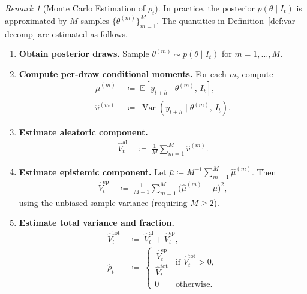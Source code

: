 \documentclass[12pt,openany]{book}
\newcommand{\calI}{\mathcal{I}}
\newcommand{\E}{\mathbb{E}}
\numberwithin{equation}{chapter}
\theoremstyle{plain}
\theoremstyle{definition}
\theoremstyle{remark}
\newtheorem{remark}[theorem]{Remark}
\numberwithin{equation}{chapter}
\theoremstyle{plain}
\DeclareMathOperator{\Var}{Var}
\def\calI{I}%
\begin{document}
\begin{remark}[Monte Carlo Estimation of $\rho_t$]
\label{rem:mc-estimate}
In practice, the posterior $p(\theta \mid \calI_t)$ is approximated
by $M$ samples $\{\theta^{(m)}\}_{m=1}^{M}$.  The quantities
in Definition~\ref{def:var-decomp} are estimated as follows.
\begin{enumerate}
  \item \textbf{Obtain posterior draws.}
        Sample $\theta^{(m)} \sim p(\theta \mid \calI_t)$ for
        $m = 1, \ldots, M$.

  \item \textbf{Compute per-draw conditional moments.}
        For each $m$, compute
        \begin{align}
          \hat\mu^{(m)}
          &\;\coloneqq\;
          \E\!\left[y_{t+h} \mid \theta^{(m)},\, \calI_t\right],
          \label{eq:mu-hat-m}\\
          \hat v^{(m)}
          &\;\coloneqq\;
          \Var\!\left(y_{t+h} \mid \theta^{(m)},\, \calI_t\right).
          \label{eq:v-hat-m}
        \end{align}

  \item \textbf{Estimate aleatoric component.}
        \begin{align}
          \hat V^{\mathrm{al}}_t
          &\;\coloneqq\;
          \frac{1}{M} \sum_{m=1}^{M} \hat v^{(m)}.
          \label{eq:Val-mc}
        \end{align}

  \item \textbf{Estimate epistemic component.}
        Let $\bar\mu \coloneqq M^{-1}\sum_{m=1}^M \hat\mu^{(m)}$.
        Then
        \begin{align}
          \hat V^{\mathrm{ep}}_t
          &\;\coloneqq\;
          \frac{1}{M-1}
          \sum_{m=1}^{M}
          \bigl(\hat\mu^{(m)} - \bar\mu\bigr)^2,
          \label{eq:Vep-mc}
        \end{align}
        using the unbiased sample variance (requiring $M \geq 2$).

  \item \textbf{Estimate total variance and fraction.}
        \begin{align}
          \hat V^{\mathrm{tot}}_t
          &\;\coloneqq\;
          \hat V^{\mathrm{al}}_t + \hat V^{\mathrm{ep}}_t,
          \label{eq:Vtot-mc}\\
          \hat\rho_t
          &\;\coloneqq\;
          \begin{cases}
            \dfrac{\hat V^{\mathrm{ep}}_t}{\hat V^{\mathrm{tot}}_t}
            & \text{if } \hat V^{\mathrm{tot}}_t > 0,\\[6pt]
            0 & \text{otherwise.}
          \end{cases}
          \label{eq:rho-mc}
        \end{align}


\end{enumerate}
\end{remark}
\end{document}
